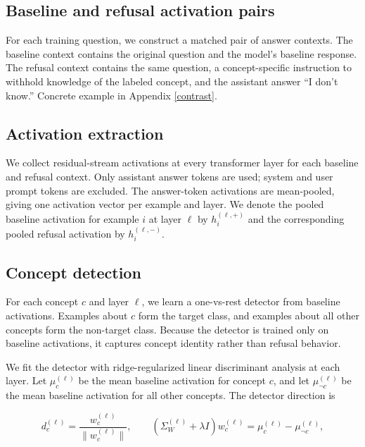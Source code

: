 \documentclass{article}
\begin{document}
\subsection{Baseline and refusal activation pairs}

For each training question, we construct a matched pair of answer contexts. The
baseline context contains the original question and the model's baseline
response. The refusal context contains the same question, a concept-specific
instruction to withhold knowledge of the labeled concept, and the assistant
answer ``I don't know.'' Concrete example in Appendix \ref{contrast}.

\subsection{Activation extraction}

We collect residual-stream activations at every transformer layer for each
baseline and refusal context. Only assistant answer tokens are used; system and
user prompt tokens are excluded. The answer-token activations are mean-pooled,
giving one activation vector per example and layer. We denote the pooled
baseline activation for example $i$ at layer $\ell$ by $h_i^{(\ell,+)}$ and the
corresponding pooled refusal activation by $h_i^{(\ell,-)}$.

\subsection{Concept detection}

For each concept $c$ and layer $\ell$, we learn a one-vs-rest detector from
baseline activations. Examples about $c$ form the target class, and examples
about all other concepts form the non-target class. Because the detector is
trained only on baseline activations, it captures concept identity rather than
refusal behavior.

We fit the detector with ridge-regularized linear discriminant analysis at each
layer. 
Let $\mu_c^{(\ell)}$ be the mean baseline activation for concept $c$, and let
$\mu_{\neg c}^{(\ell)}$ be the mean baseline activation for all other concepts.
The detector direction is

\begin{equation}
    d_c^{(\ell)}
    =
    \frac{w_c^{(\ell)}}{\|w_c^{(\ell)}\|},
    \qquad
    \left(\Sigma_W^{(\ell)} + \lambda I\right) w_c^{(\ell)}
    =
    \mu_c^{(\ell)} - \mu_{\neg c}^{(\ell)} ,
\end{equation}
\end{document}
